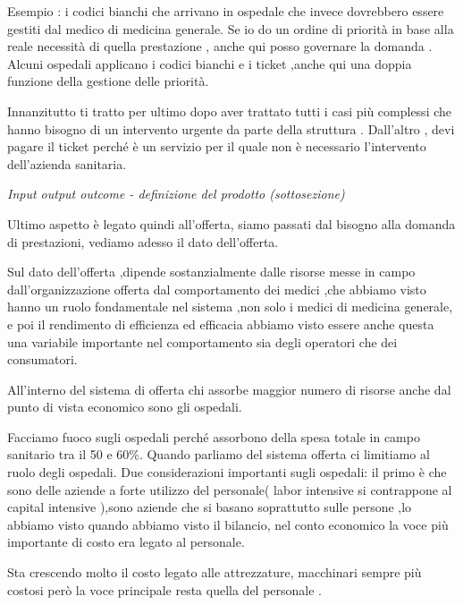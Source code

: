 \documentclass[]{article}
\begin{document}
Esempio : i codici bianchi che arrivano in ospedale che invece
dovrebbero essere gestiti dal medico di medicina generale. Se io do un
ordine di priorità in base alla reale necessità di quella prestazione ,
anche qui posso governare la domanda . Alcuni ospedali applicano i
codici bianchi e i ticket ,anche qui una doppia funzione della gestione
delle priorità.

Innanzitutto ti tratto per ultimo dopo aver trattato tutti i casi più
complessi che hanno bisogno di un intervento urgente da parte della
struttura . Dall'altro , devi pagare il ticket perché è un servizio per
il quale non è necessario l'intervento dell'azienda sanitaria.

\emph{Input output outcome - definizione del prodotto (sottosezione)}

Ultimo aspetto è legato quindi all'offerta, siamo passati dal bisogno
alla domanda di prestazioni, vediamo adesso il dato dell'offerta.

Sul dato dell'offerta ,dipende sostanzialmente dalle risorse messe in
campo dall'organizzazione offerta dal comportamento dei medici ,che
abbiamo visto hanno un ruolo fondamentale nel sistema ,non solo i medici
di medicina generale, e poi il rendimento di efficienza ed efficacia
abbiamo visto essere anche questa una variabile importante nel
comportamento sia degli operatori che dei consumatori.

All'interno del sistema di offerta chi assorbe maggior numero di risorse
anche dal punto di vista economico sono gli ospedali.

Facciamo fuoco sugli ospedali perché assorbono della spesa totale in
campo sanitario tra il 50 e 60\%. Quando parliamo del sistema offerta ci
limitiamo al ruolo degli ospedali. Due considerazioni importanti sugli
ospedali: il primo è che sono delle aziende a forte utilizzo del
personale( labor intensive si contrappone al capital intensive ),sono
aziende che si basano soprattutto sulle persone ,lo abbiamo visto quando
abbiamo visto il bilancio, nel conto economico la voce più importante di
costo era legato al personale.

Sta crescendo molto il costo legato alle attrezzature, macchinari sempre
più costosi però la voce principale resta quella del personale .
\end{document}
